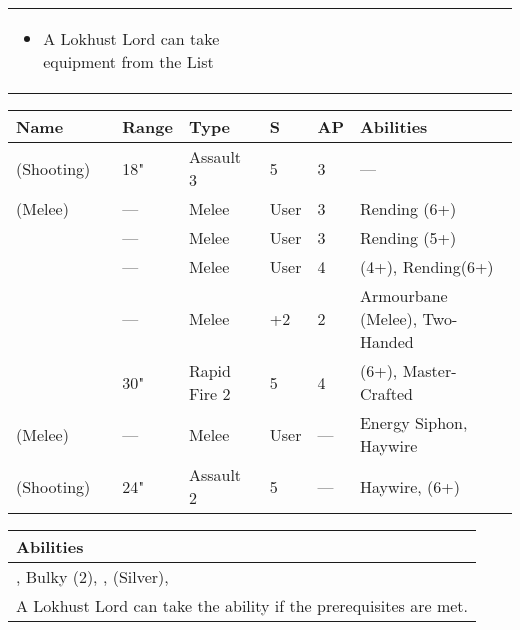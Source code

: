 \begin{tabular}{||m{10pt} m{90pt} m{30pt} m{11pt} m{11pt} m{11pt} m{11pt} m{11pt} m{11pt} m{11pt} m{11pt} m{11pt} m{11pt} m{135pt}||}
{\begin{itemize}
\begin{itemize}
				\item A \quickref{Phylactery} \hrulefill X pt
				\item A \quickref{Resurrection Orb} \hrulefill X pt
				\item A \quickref{Sempiternal Weave} \hrulefill X pt
				\item A \quickref{Tesseract Labyrinth} \hrulefill X pt
			\end{itemize}
			\item A Lokhust Lord can take equipment from the \quickref{Artefacts of the Aeons} List
	\end{itemize}} \\		
\end{tabular}

\noindent
\begin{tabular}{||m{110pt} m{30pt} m{31pt} m{55pt} m{12pt} m{12pt} m{210pt}||}
	\hline
	Name & & Range & Type & S & AP & Abilities \\
	\hline
	\quickref{Staff of Light} (Shooting) & & 18" & Assault 3 & 5 & 3 & — \\
	\quickref{Staff of Light} (Melee) & & — & Melee & User & 3 & Rending (6+) \\
	\quickref{Hyperphase Sword} &  & — & Melee & User & 3 & Rending (5+) \\
	\quickref{Voidblade} &  & — & Melee & User & 4 & \quickref{Entropic Strike} (4+), Rending(6+) \\
	\quickref{Warscythe} &  & — & Melee & +2 & 2 & Armourbane (Melee), Two-Handed \\
	\quickref{Relic Gauss Blaster} & & 30" & Rapid Fire 2 & 5 & 4 & \quickref{Gauss} (6+), Master-Crafted \\
	\quickref{Rod of Night} (Melee) & & — & Melee & User & — & Energy Siphon, Haywire \\
	\quickref{Rod of Night} (Shooting) & & 24" & Assault 2 & 5 & — & Haywire, \quickref{Tesla} (6+) \\
	\hline
\end{tabular}

\noindent
\begin{tabular}{||m{532pt}||}
	\hline
	Abilities \\
	\hline
	\quickref{Annihilation Protocols}, Bulky (2), \quickref{Command Protocols}, \quickref{Nodal Command}(Silver), \quickref{Reanimation Protocols} \\
	A Lokhust Lord can take the \quickref{Decurion Nemesor} ability if the prerequisites are met. \\
	\hline
\end{tabular}


